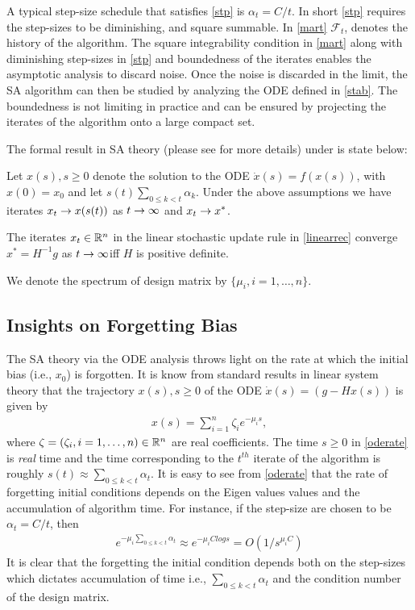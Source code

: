 A typical step-size schedule that satisfies \ref{stp} is $\alpha_t=C/t$. In short \ref{stp} requires the step-sizes to be diminishing, and square summable. In \ref{mart} $\mathcal{F}_t$, denotes the history of the algorithm. The square integrability condition in \ref{mart} along with diminishing step-sizes in \ref{stp} and boundedness of the iterates enables the asymptotic analysis to discard noise. Once the noise is discarded in the limit, the SA algorithm can then be studied by analyzing the ODE defined in \ref{stab}. The boundedness is not limiting in practice and can be ensured by projecting the iterates of the algorithm onto a large compact set.\par
The formal result in SA theory (please see \cite{SA} for more details) under  is state below:
\begin{theorem}\label{sat}
Let $x(s),s\geq 0$ denote the solution to the ODE $\dot{x}(s)=f(x(s))$, with $x(0)=x_0$ and let $s(t)\sum_{0\leq k< t}\alpha_k$. Under the above assumptions we have iterates $x_t\rightarrow x(s(t))$ as $t\rightarrow\infty$ and $x_t\rightarrow x^*$.
\end{theorem}
\begin{corollary}\label{linstab}
The iterates $x_t\in \mathbb{R}^n$ in the linear stochastic update rule in \eqref{linearrec} converge $x^*=H^{-1}g$ as $t\rightarrow\infty $iff $H$ is positive definite.
\end{corollary}
We denote the spectrum of design matrix by $\{\mu_i,i=1,\ldots,n\}$.
\subsection{Insights on Forgetting Bias}\label{initial}
The SA theory via the ODE analysis throws light on the rate at which the initial bias (i.e., $x_0$) is forgotten. It is know from standard results in linear system theory that the trajectory $x(s),s\geq 0$ of the ODE $\dot{x}(s)=(g-Hx(s))$ is given by
\begin{align}\label{oderate}
x(s)=\sum_{i=1}^n \zeta_i e^{-\mu_i s}, 
\end{align}
where $\zeta=(\zeta_i,i=1,\ldots,n)\in \mathbb{R}^n$ are real coefficients. The time $s\geq 0$ in \eqref{oderate} is \emph{real} time and the time corresponding to the $t^{th}$ iterate of the algorithm is roughly $s(t)\approx\sum_{0\leq k<t}\alpha_t$. It is easy to see from \eqref{oderate} that the rate of forgetting initial conditions depends on the Eigen values values and the accumulation of algorithm time. For instance, if the step-size are chosen to be $\alpha_t=C/t$, then \begin{align}\label{biasforget}e^{-\mu_i\sum_{0\leq k<t}\alpha_t}\approx e^{-\mu_i Clog s}=O(1/s^{\mu_i C})\end{align}
It is clear that the forgetting the initial condition depends both on the step-sizes which dictates accumulation of time i.e., $\sum_{0\leq k<t}\alpha_t$ and the condition number of the design matrix. 
